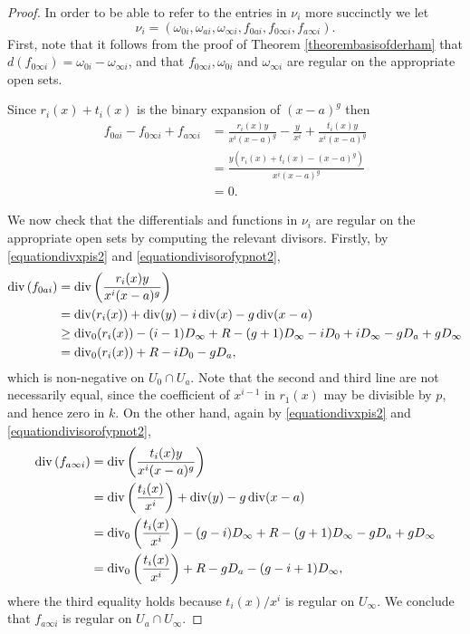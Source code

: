     \begin{proof}
    In order to be able to refer to the entries in $\nu_i$ more succinctly we let
        \[
        \nu_i = \left( \omega_{0 i}, \omega_{a i}, \omega_{\infty i}, f_{0 a i}, f_{0 \infty i}, f_{a \infty i} \right).
        \]
    First, note that it follows from the proof of Theorem \ref{theorembasisofderham} that $d(f_{0 \infty i}) = \omega_{0 i} - \omega_{\infty i}$, and that $f_{0 \infty i}, \omega_{0 i}$ and $\omega_{\infty i}$ are regular on the appropriate open sets.
    
    Since $r_i(x)+t_i(x)$ is the binary expansion of $(x-a)^g$ then
        \begin{align*}
        f_{0 a i} - f_{0 \infty i}+ f_{a \infty i} & = \frac{r_i(x)y}{x^i(x-a)^g} - \frac{y}{x^i} + \frac{t_i(x)y}{x^i(x-a)^g} \\
        & = \frac{y(r_i(x) + t_i(x) - (x-a)^g)}{x^i(x-a)^g} \\
        & = 0.
        \end{align*}

    We now check that the differentials and functions in $\nu_i$ are regular on the appropriate open sets by computing the relevant divisors.
    Firstly, by \eqref{equationdivxpis2} and \eqref{equationdivisorofypnot2},
        \begin{align*}
        \operatorname{div} \left( f_{0 a i} \right) & = \operatorname{div} \left( \frac{r_i(x)y}{x^i(x-a)^g} \right) \\
        &  = \operatorname{div}(r_i(x)) + \operatorname{div}(y) - i\operatorname{div}(x) - g\operatorname{div}(x-a) \\
        & \geq \operatorname{div}_0(r_i(x)) - (i-1)D_\infty +R - (g+1)D_\infty - iD_0 + iD_\infty - gD_a + gD_\infty \\
        & = \operatorname{div}_0(r_i(x)) +R -iD_0 - gD_a,
        \end{align*}
    which is non-negative on $U_0 \cap U_a$.
    Note that the second and third line are not necessarily equal, since the coefficient of $x^{i-1}$ in $r_1(x)$ may be divisible by $p$, and hence zero in $k$.
    On the other hand, again by \eqref{equationdivxpis2} and \eqref{equationdivisorofypnot2},
        \begin{align*}
        \operatorname{div} \left( f_{a \infty i} \right) & = \operatorname{div} \left( \frac{t_i(x)y}{x^i(x-a)^g} \right) \\
        & = \operatorname{div}\left(\frac{t_i(x)}{x^i}\right) + \operatorname{div}(y) - g\operatorname{div}(x-a) \\
        & = \operatorname{div}_0 \left( \frac{t_i(x)}{x^i} \right) - (g-i)D_\infty +R - (g+1)D_\infty - gD_a + gD_\infty\\
        & = \operatorname{div}_0 \left( \frac{t_i(x)}{x^i} \right) +R - gD_a -(g-i+1)D_\infty,
        \end{align*}
    where the third equality holds because $t_i(x)/x^i$ is regular on $U_\infty$.
    We conclude that $f_{a \infty i}$ is regular on $U_a \cap U_\infty$.
    

\end{proof}
